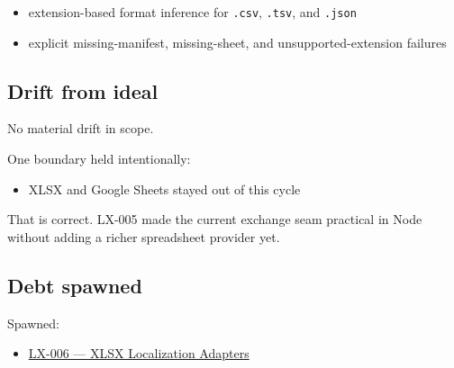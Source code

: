 \begin{itemize}
  \begin{itemize}
  \tightlist
  \item
    reading/writing one \texttt{E\allowbreak{}x\allowbreak{}c\allowbreak{}h\allowbreak{}a\allowbreak{}n\allowbreak{}g\allowbreak{}e\allowbreak{}S\allowbreak{}h\allowbreak{}e\allowbreak{}e\allowbreak{}t} file as CSV or TSV
  \item
    reading/writing one \texttt{C\allowbreak{}a\allowbreak{}t\allowbreak{}a\allowbreak{}l\allowbreak{}o\allowbreak{}g\allowbreak{}B\allowbreak{}u\allowbreak{}n\allowbreak{}d\allowbreak{}l\allowbreak{}e} file as JSON
  \item
    reading/writing workbook directories with a versioned manifest
  \end{itemize}
\item
  extension-based format inference for \texttt{.\allowbreak{}c\allowbreak{}s\allowbreak{}v}, \texttt{.\allowbreak{}t\allowbreak{}s\allowbreak{}v}, and \texttt{.\allowbreak{}j\allowbreak{}s\allowbreak{}o\allowbreak{}n}
\item
  explicit missing-manifest, missing-sheet, and unsupported-extension failures
\end{itemize}

\subsection{Drift from ideal}\label{record-192-drift-from-ideal}

No material drift in scope.

One boundary held intentionally:

\begin{itemize}
\tightlist
\item
  XLSX and Google Sheets stayed out of this cycle
\end{itemize}

That is correct. LX-005 made the current exchange seam practical in Node without adding a richer spreadsheet provider yet.

\subsection{Debt spawned}\label{record-192-debt-spawned}

Spawned:

\begin{itemize}
\tightlist
\item
  \href{https://github.com/flyingrobots/bijou/blob/cbd70612140e7a450d764b3c7be1c6af878b99bc/docs/design/LX-006-xlsx-localization-adapters.md}{LX-006 --- XLSX Localization Adapters}
\end{itemize}

